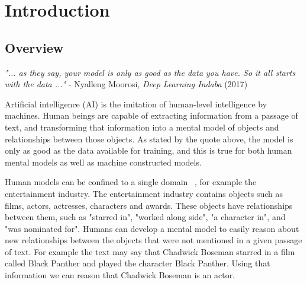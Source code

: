
\chapter{Introduction}  %

\ifpdf
     \graphicspath{{Figs/Chapter1/}}
\else
    \graphicspath{{Chapter1/Figs/Vector/}{Chapter1/Figs/}}
\fi



\section{Overview} %

\emph{"... as they say, your model is only as good as the data you have. \newline So it all starts with the data ..."} \newline
\indent \indent - Nyalleng Moorosi, \emph{Deep Learning Indaba} (2017) \par

\smallskip

\noindent Artificial intelligence (AI) is the imitation of human-level intelligence by machines. Human beings are capable of extracting information from a passage of text, and transforming that information into a mental model of objects and relationships between those objects. As stated by the quote above, the model is only as good as the data available for training, and this is true for both human mental models as well as machine constructed models. \par

\noindent Human models can be confined to a single domain \unskip~\citep{staab2010handbook}, for example the entertainment industry. The entertainment industry contains objects such as films, actors, actresses, characters and awards. These objects have relationships between them, such as "starred in", "worked along side", "a character in", and "was nominated for". Humans can develop a mental model to easily reason about new relationships between the objects that were not mentioned in a given passage of text. For example the text may say that Chadwick Boseman starred in a film called Black Panther and played the character Black Panther. Using that information we can reason that Chadwick Boseman is an actor. \par


